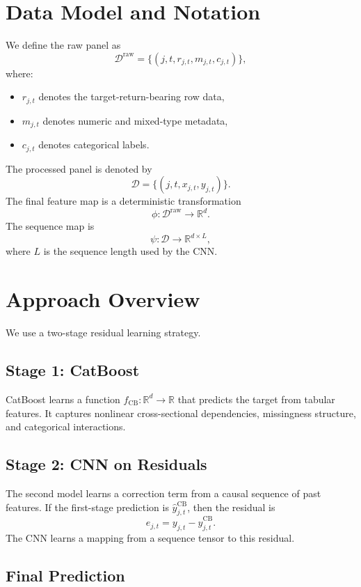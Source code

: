 \documentclass[11pt]{article}
\newcommand{\R}{\mathbb{R}}
\newcommand{\1}{\mathbf{1}}
\newcommand{\D}{\mathcal{D}}
\begin{document}
\section{Data Model and Notation}

We define the raw panel as
\[
\D^{\mathrm{raw}} = \{ (j,t,r_{j,t}, m_{j,t}, c_{j,t}) \},
\]
where:
\begin{itemize}
  \item $r_{j,t}$ denotes the target-return-bearing row data,
  \item $m_{j,t}$ denotes numeric and mixed-type metadata,
  \item $c_{j,t}$ denotes categorical labels.
\end{itemize}

The processed panel is denoted by
\[
\D = \{(j,t,x_{j,t},y_{j,t})\}.
\]
The final feature map is a deterministic transformation
\[
\phi : \D^{\mathrm{raw}} \to \R^d.
\]
The sequence map is
\[
\psi : \D \to \R^{d \times L},
\]
where $L$ is the sequence length used by the CNN.

\section{Approach Overview}

We use a two-stage residual learning strategy.

\subsection{Stage 1: CatBoost}

CatBoost learns a function $f_{\mathrm{CB}} : \R^d \to \R$ that predicts the target from tabular features. It captures nonlinear cross-sectional dependencies, missingness structure, and categorical interactions.

\subsection{Stage 2: CNN on Residuals}

The second model learns a correction term from a causal sequence of past features. If the first-stage prediction is $\hat y^{\mathrm{CB}}_{j,t}$, then the residual is
\[
e_{j,t} = y_{j,t} - \hat y^{\mathrm{CB}}_{j,t}.
\]
The CNN learns a mapping from a sequence tensor to this residual.

\subsection{Final Prediction}
\end{document}
